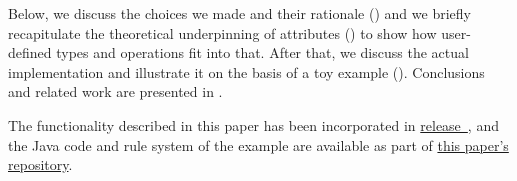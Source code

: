 Below, we discuss the choices we made and their rationale () and we briefly recapitulate the theoretical underpinning of \GROOVE attributes () to show how user-defined types and operations fit into that. After that, we discuss the actual implementation and illustrate it on the basis of a toy example (). Conclusions and related work are presented in .

The functionality described in this paper has been incorporated in \href{https://github.com/nl-utwente-groove/code/releases/tag/release-\GROOVEversion}{\GROOVE release~\GROOVEversion}, and the Java code and \GROOVE rule system of the example are available as part of \href{https://github.com/nl-utwente-groove/userops.git}{this paper's repository}.
